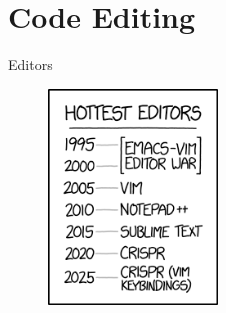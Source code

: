 \documentclass{setbeamer}
\begin{document}
\section{Code Editing}

\begin{frame}{Editors}
    \begin{figure}[h]
        \includegraphics[width=4.5cm, keepaspectratio]{./resources/hottest_editors.png}
        \caption*{}
    \end{figure}

\end{frame}
\end{document}
